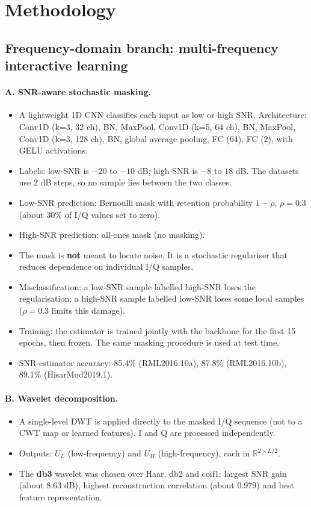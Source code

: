 \documentclass[11pt,a4paper]{article}
\begin{document}
\section{Methodology}

\subsection{Frequency-domain branch: multi-frequency interactive learning}

\paragraph{A. SNR-aware stochastic masking.}
\begin{itemize}
  \item A lightweight 1D CNN classifies each input as low or high SNR. Architecture: Conv1D (k=3, 32 ch), BN, MaxPool, Conv1D (k=5, 64 ch), BN, MaxPool, Conv1D (k=3, 128 ch), BN, global average pooling, FC (64), FC (2), with GELU activations.
  \item Labels: low-SNR is $-20$ to $-10$ dB; high-SNR is $-8$ to $18$ dB. The datasets use 2 dB steps, so no sample lies between the two classes.
  \item Low-SNR prediction: Bernoulli mask with retention probability $1-\rho$, $\rho = 0.3$ (about 30\% of I/Q values set to zero).
  \item High-SNR prediction: all-ones mask (no masking).
  \item The mask is \textbf{not} meant to locate noise. It is a stochastic regulariser that reduces dependence on individual I/Q samples.
  \item Misclassification: a low-SNR sample labelled high-SNR loses the regularisation; a high-SNR sample labelled low-SNR loses some local samples ($\rho = 0.3$ limits this damage).
  \item Training: the estimator is trained jointly with the backbone for the first 15 epochs, then frozen. The same masking procedure is used at test time.
  \item SNR-estimator accuracy: 85.4\% (RML2016.10a), 87.8\% (RML2016.10b), 89.1\% (HisarMod2019.1).
\end{itemize}

\paragraph{B. Wavelet decomposition.}
\begin{itemize}
  \item A single-level DWT is applied directly to the masked I/Q sequence (not to a CWT map or learned features). I and Q are processed independently.
  \item Outputs: $U_L$ (low-frequency) and $U_H$ (high-frequency), each in $\mathbb{R}^{2\times L/2}$.
  \item The \textbf{db3} wavelet was chosen over Haar, db2 and coif1: largest SNR gain (about 8.63 dB), highest reconstruction correlation (about 0.979) and best feature representation.
\end{itemize}
\end{document}
